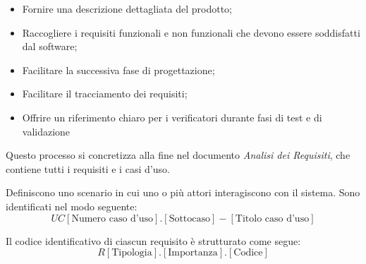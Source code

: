        \begin{itemize}
            \item Fornire una descrizione dettagliata del prodotto;
            \item Raccogliere i requisiti funzionali e non funzionali che devono essere soddisfatti dal software;
            \item Facilitare la successiva fase di progettazione;
            \item Facilitare il tracciamento dei requisiti;
            \item Offrire un riferimento chiaro per i verificatori durante fasi di test e di validazione
        \end{itemize}

        Questo processo si concretizza alla fine nel documento \textit{Analisi dei Requisiti}, 
        che contiene tutti i requisiti e i casi d'uso.
        
        Definiscono uno scenario in cui uno o più attori interagiscono con il sistema. Sono
        identificati nel modo seguente:
        \textbf{
        \[
        UC[\text{Numero caso d'uso}].[\text{Sottocaso}] - [\text{Titolo caso d'uso}]
        \]
        }
        
         \vspace{1em}
         Il codice identificativo di ciascun requisito è strutturato come segue:
        \textbf{
        \[
        R[\text{Tipologia}].[ \text{Importanza}].[ \text{Codice}]
        \]
        }
        
